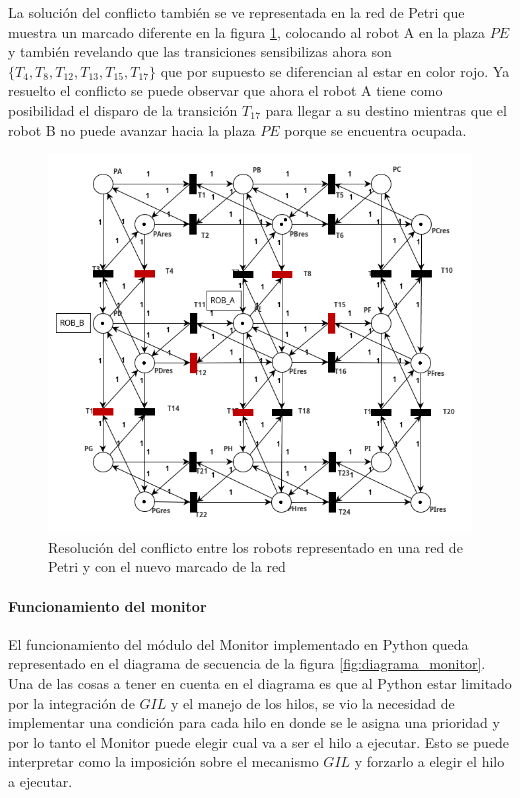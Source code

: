 La solución del conflicto también se ve representada en la red de Petri que muestra un marcado diferente en la figura \ref{fig:rdp_no_grid_conflicto_solucionado}, colocando al robot A en la plaza $PE$ y también revelando que las transiciones sensibilizas ahora son $\{T_4, T_8, T_{12}, T_{13}, T_{15}, T_{17}\}$ que por supuesto se diferencian al estar en color rojo. Ya resuelto el conflicto se puede observar que ahora el robot A tiene como posibilidad el disparo de la transición $T_{17}$ para llegar a su destino mientras que el robot B no puede avanzar hacia la plaza $PE$ porque se encuentra ocupada.

\begin{figure}[H]
    \centering
    \includegraphics[width=0.7\linewidth]{images/rdp_no_grid_conflicto_solucionado.png}
    \caption{Resolución del conflicto entre los robots representado en una red de Petri y con el nuevo marcado de la red}
    \label{fig:rdp_no_grid_conflicto_solucionado}
\end{figure}

\newpage
\paragraph{Funcionamiento del monitor} \mbox{} \vspace{8pt}

El funcionamiento del módulo del Monitor implementado en Python queda representado en el diagrama de secuencia de la figura \ref{fig:diagrama_monitor}.
Una de las cosas a tener en cuenta en el diagrama es que al Python estar limitado por la integración de $GIL$ y el manejo de los hilos, se vio la necesidad de implementar una condición para cada hilo en donde se le asigna una prioridad y por lo tanto el Monitor puede elegir cual va a ser el hilo a ejecutar. Esto se puede interpretar como la imposición sobre el mecanismo $GIL$ y forzarlo a elegir el hilo a ejecutar.

